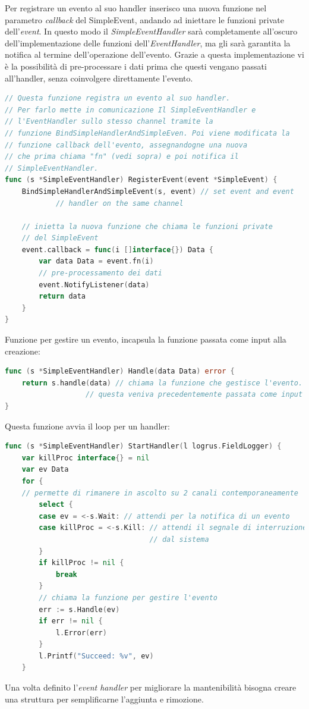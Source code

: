 \documentclass[main.tex]{subfiles}
\begin{document}
Per registrare un evento al suo handler inserisco una nuova funzione nel parametro \emph{callback} del SimpleEvent, andando ad iniettare le funzioni private dell'\emph{event}. In questo modo il \emph{SimpleEventHandler} sarà completamente all'oscuro dell'implementazione delle funzioni dell'\emph{EventHandler}, ma gli sarà garantita la notifica al termine dell'operazione dell'evento.\newline
Grazie a questa implementazione vi è la possibilità di pre-processare i dati prima che questi vengano passati all'handler, senza coinvolgere direttamente l'evento.
\begin{lstlisting}[language=go]
// Questa funzione registra un evento al suo handler.
// Per farlo mette in comunicazione Il SimpleEventHandler e 
// l'EventHandler sullo stesso channel tramite la 
// funzione BindSimpleHandlerAndSimpleEven. Poi viene modificata la 
// funzione callback dell'evento, assegnandogne una nuova 
// che prima chiama "fn" (vedi sopra) e poi notifica il 
// SimpleEventHandler.
func (s *SimpleEventHandler) RegisterEvent(event *SimpleEvent) {
    BindSimpleHandlerAndSimpleEvent(s, event) // set event and event 
            // handler on the same channel

    // inietta la nuova funzione che chiama le funzioni private 
    // del SimpleEvent
    event.callback = func(i []interface{}) Data {
        var data Data = event.fn(i)  
        // pre-processamento dei dati
        event.NotifyListener(data)
        return data
    }
}
\end{lstlisting}
Funzione per gestire un evento, incapsula la funzione passata come input alla creazione:
\begin{lstlisting}[language=go]
func (s *SimpleEventHandler) Handle(data Data) error {
    return s.handle(data) // chiama la funzione che gestisce l'evento.
                   // questa veniva precedentemente passata come input
}
\end{lstlisting}
Questa funzione avvia il loop per un handler:
\begin{lstlisting}[language=go]
func (s *SimpleEventHandler) StartHandler(l logrus.FieldLogger) {
    var killProc interface{} = nil
    var ev Data
    for {
    // permette di rimanere in ascolto su 2 canali contemporaneamente
        select {
        case ev = <-s.Wait: // attendi per la notifica di un evento
        case killProc = <-s.Kill: // attendi il segnale di interruzione
                                  // dal sistema
        }
        if killProc != nil {
            break
        }
        // chiama la funzione per gestire l'evento
        err := s.Handle(ev)
        if err != nil {
            l.Error(err)
        }
        l.Printf("Succeed: %v", ev)
	}
\end{lstlisting}
Una volta definito l'\emph{event handler} per migliorare la mantenibilità bisogna creare una struttura per semplificarne l'aggiunta e rimozione.
\end{document}
